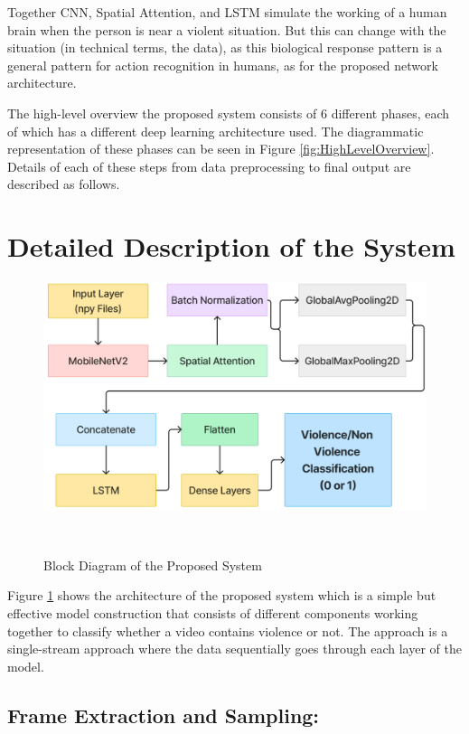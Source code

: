 \clearpage

\noindent Together CNN, Spatial Attention, and LSTM simulate the working of a human brain when the person is near a violent situation. But this can change with the situation (in technical terms, the data), as this biological response pattern is a general pattern for action recognition in humans, as for the proposed network architecture.


\noindent The high-level overview the proposed system consists of 6 different phases, each of which has a different deep learning architecture used. The diagrammatic representation of these phases can be seen in Figure \ref{fig:HighLevelOverview}. Details of each of these steps from data preprocessing to final output are described as follows.


\section{Detailed Description of the System}

\begin{figure}[!htbp]
    \centering
    \includegraphics[width=0.74\linewidth]{Images/prop_sys.jpg}
    \caption{Block Diagram of the Proposed System}\
    \label{fig:BlockDiagram}
\end{figure}

\noindent Figure \ref{fig:BlockDiagram} shows the architecture of the proposed system which is a simple but effective model construction that consists of different components working together to classify whether a video contains violence or not. The approach is a single-stream approach where the data sequentially goes through each layer of the model.

\clearpage

\subsection{Frame Extraction and Sampling: }

